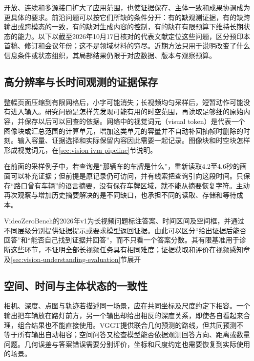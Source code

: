 开放、连续和多源接口扩大了应用范围，也使证据保存、主体一致和成果协调成为更具体的要求。前沿问题可以按它们所缺的条件分开：有的缺观测证据，有的缺跨输出或跨模态的一致，有的缺对生成内容的控制，有的缺在有限预算下维持长期状态的能力。以下以截至2026年10月17日核对的代表文献定位这些问题，区分预印本首稿、修订和会议年份；这不是领域材料的穷尽。近期方法只用于说明改变了什么信息条件或状态组织，其局部结果仍限于对应数据、版本与观察预算。

\subsection{高分辨率与长时间观测的证据保存}
\label{sec:vision-overview-evidence-frontier}

整幅页面压缩到有限网格后，小字可能消失；长视频均匀采样后，短暂动作可能没有进入输入。研究问题是怎样先发现可能有用的时空范围，再读取足够细的原始内容，并保存以后可以回查的依据。网络中的视觉词元（visual token）是代表一个图像块或汇总范围的计算单元，增加这类单元的容量并不自动补回抽帧时删除的时刻。输入容量、证据选择和实际保留内容因此需要一起记录。图像块和时空块怎样形成视觉词元，在\ref{sec:vision-ivm-pipeline}节说明。

在前面的采样例子中，若查询是“那辆车的车牌是什么”，重新读取4.2至4.6秒的画面可以补充证据；但前提是原记录仍可访问，并有线索把查询引向这段时间。只保存“路口曾有车辆”的语言摘要，没有保存车牌区域，就不能从摘要恢复字符。主动再次观察与增加历史摘要解决的是不同缺口，也承担不同的读取、存储和等待成本。

VideoZeroBench的2026年v1为长视频问题标注答案、时间区间及空间框，并通过不同层级分别提供证据提示或要求模型返回证据。由此可以区分“给出证据后能否回答”和“能否自己找到证据并回答”，而不只看一个答案分数。其有限基准用于诊断这些环节，不证明全部长视频任务具有相同难度；证据获取和评价在视频感知章及\ref{sec:vision-understanding-evaluation}节展开

\subsection{空间、时间与主体状态的一致性}
\label{sec:vision-overview-consistency-frontier}

相机、深度、点图与轨迹若描述同一场景，应在共同坐标及尺度约定下相容。一个输出把车辆放在路灯前方，另一个输出却给出相反的深度关系，即使各自看起来合理，组合结果也不能直接使用。VGGT提供联合几何预测的路线，但共同预测不等于所有输出自动相容；空间问答又检查模型能否依据观测回答方向、距离或数量问题。几何误差与答案错误需要分别评价，坐标和尺度约定也需要恢复到实际使用的场景。

